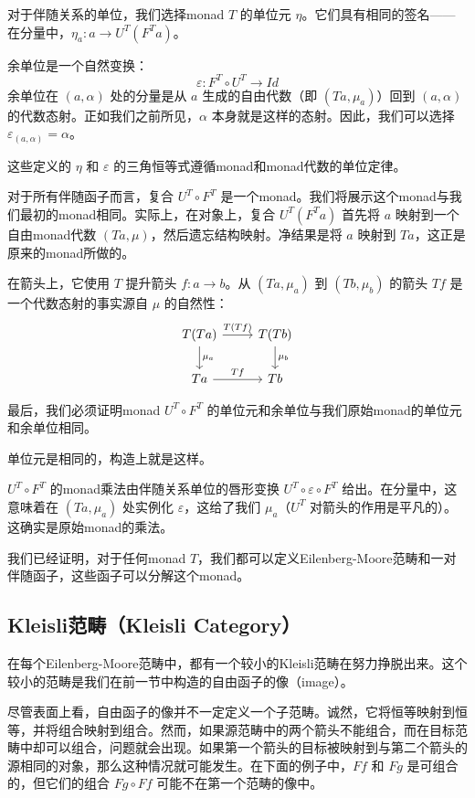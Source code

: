 \documentclass[DaoFP]{subfiles}
\begin{document}
    对于伴随关系的单位，我们选择monad $T$ 的单位元 $\eta$。它们具有相同的签名——在分量中，$\eta_a \colon a \to U^T (F^T a)$。

    余单位是一个自然变换：
    \[ \varepsilon \colon F^T \circ U^T \to Id \]
    余单位在 $(a, \alpha)$ 处的分量是从 $a$ 生成的自由代数（即 $(T a, \mu_a)$）回到 $(a, \alpha)$ 的代数态射。正如我们之前所见，$\alpha$ 本身就是这样的态射。因此，我们可以选择 $\varepsilon_{(a, \alpha)} = \alpha$。

    这些定义的 $\eta$ 和 $\varepsilon$ 的三角恒等式遵循monad和monad代数的单位定律。

    对于所有伴随函子而言，复合 $U^T \circ F^T$ 是一个monad。我们将展示这个monad与我们最初的monad相同。实际上，在对象上，复合 $U^T (F^T a)$ 首先将 $a$ 映射到一个自由monad代数 $(T a, \mu)$，然后遗忘结构映射。净结果是将 $a$ 映射到 $T a$，这正是原来的monad所做的。

    在箭头上，它使用 $T$ 提升箭头 $f \colon a \to b$。从 $(T a, \mu_a)$ 到 $(T b, \mu_b)$ 的箭头 $T f$ 是一个代数态射的事实源自 $\mu$ 的自然性：
    \[
        \begin{tikzcd}
            T (T a)
            \arrow[r, "T( T f)"]
            \arrow[d, "\mu_a"]
            & T (T b)
            \arrow[d, "\mu_b"]
            \\
            T a
            \arrow[r, "T f"]
            & T b
        \end{tikzcd}
    \]

    最后，我们必须证明monad $U^T \circ F^T$ 的单位元和余单位与我们原始monad的单位元和余单位相同。

    单位元是相同的，构造上就是这样。

    $U^T \circ F^T$ 的monad乘法由伴随关系单位的唇形变换 $U^T \circ \varepsilon \circ F^T$ 给出。在分量中，这意味着在 $(T a, \mu_a)$ 处实例化 $\varepsilon$，这给了我们 $\mu_a$（$U^T$ 对箭头的作用是平凡的）。这确实是原始monad的乘法。

    我们已经证明，对于任何monad $T$，我们都可以定义Eilenberg-Moore范畴和一对伴随函子，这些函子可以分解这个monad。

    \subsection{Kleisli范畴（Kleisli Category）}

    在每个Eilenberg-Moore范畴中，都有一个较小的Kleisli范畴在努力挣脱出来。这个较小的范畴是我们在前一节中构造的自由函子的像（image）。

    尽管表面上看，自由函子的像并不一定定义一个子范畴。诚然，它将恒等映射到恒等，并将组合映射到组合。然而，如果源范畴中的两个箭头不能组合，而在目标范畴中却可以组合，问题就会出现。如果第一个箭头的目标被映射到与第二个箭头的源相同的对象，那么这种情况就可能发生。在下面的例子中，$F f$ 和 $F g$ 是可组合的，但它们的组合 $F g \circ F f$ 可能不在第一个范畴的像中。
\end{document}
